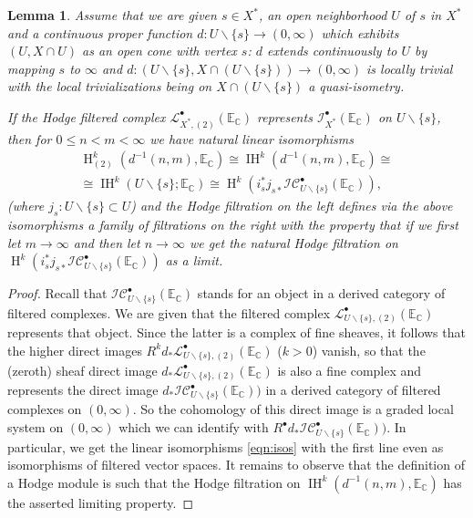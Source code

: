 \documentclass[10pt,a4paper]{amsart}
\newtheorem{lemma}{Lemma}
\def\CC{{\mathbb C}}
\def\Cscr{{\mathscr C}}
\def\EE{{\mathbb E}}
\newcommand\Hl{\operatorname{H}}
\newcommand\IH{\operatorname{IH}}
\def\Iscr{{\mathscr I}}
\def\Lscr{{\mathscr L}}
\def\pt{{\scriptscriptstyle\bullet}}
\def\ssm{\smallsetminus}
\begin{document}
\begin{lemma}\label{lemma:limit}  
Assume that we are given $s\in X^*$, an open  neighborhood $U$ of $s$ in $X^*$ and a continuous  proper function 
$d: U\ssm \{s\}\to (0,\infty)$  which exhibits $(U, X\cap U)$ as an open cone with vertex $s$: $d$ extends continuously to $U$ by  mapping $s$ to $\infty$ and  $d: (U\ssm \{s\}, X\cap (U\ssm \{s\}))\to (0,\infty)$ is locally trivial with the local trivializations being on
$ X\cap (U\ssm \{s\})$ a quasi-isometry. 

If the Hodge filtered complex $\Lscr^\pt_{X^*,(2)}(\EE_\CC)$ represents $\Iscr^\pt_{X^*}(\EE_\CC)$ on  $U\ssm \{s\}$, 
then  for  $0\le n<m <\infty$  we have   natural linear  isomorphisms 
\begin{multline}\label{eqn:isos}
\Hl^k_{(2)} (d^{-1}(n,m), \EE_\CC)\cong\IH^k (d^{-1}(n,m), \EE_\CC)\cong\\
\cong  \IH^k(U\ssm \{s\}; \EE_\CC)\cong\Hl^k(i_s^*j_{s*}\Iscr\Cscr_{U\ssm\{s\}}^\pt(\EE_\CC)),
\end{multline}
(where  $j_s:U\ssm \{s\}\subset U$) and  the  Hodge filtration on  the left   defines via the above isomorphisms a family of filtrations on the right with the property that  if we first let $m\to \infty$ and then let $n\to \infty$ we get the natural  Hodge filtration on $\Hl^k(i^*_sj_{s*}\Iscr\Cscr_{U\ssm\{s\}}^\pt(\EE_\CC))$ as a limit.
\end{lemma}

\begin{proof}
Recall that  $\Iscr\Cscr_{U\ssm\{s\}}^\pt(\EE_\CC)$ stands for an object in a derived category of filtered complexes. We are given that the filtered complex $\Lscr^\pt_{U\ssm\{s\},(2)}(\EE_\CC)$ represents that object. Since  the latter   is a complex of  fine sheaves, it follows that the higher direct images $R^kd_*\Lscr^\pt_{U\ssm\{s\},(2)}(\EE_\CC)$ ($k>0$) vanish, so that 
the (zeroth) sheaf direct image $d_*\Lscr^\pt_{U\ssm\{s\},(2)}(\EE_\CC)$ is also a fine complex and represents the direct image 
$d_*\Iscr\Cscr_{U\ssm\{s\}}^\pt(\EE_\CC))$ in a  derived category of  filtered complexes on $(0, \infty)$. So the cohomology of this direct image is a graded local system on $(0, \infty)$ which we can  identify with $R^\pt d_*\Iscr\Cscr_{U\ssm\{s\}}^\pt(\EE_\CC))$. 
In particular, we  get the linear isomorphisms \eqref{eqn:isos}  with the first line even as  isomorphisms of filtered vector spaces. 
It remains to observe  that the definition of a  Hodge module is such that the Hodge  filtration on $\IH^k (d^{-1}(n,m), \EE_\CC)$ has the asserted limiting property.
\end{proof}
\end{document}
